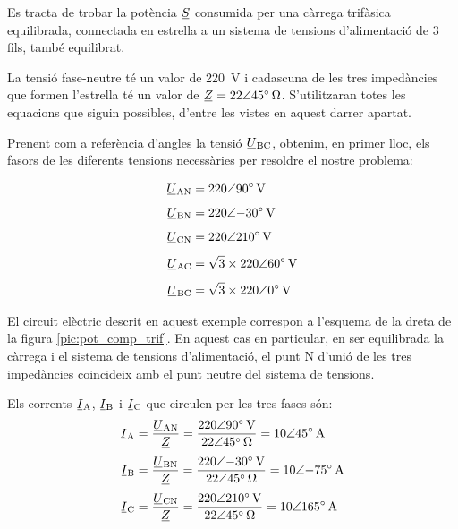 	
\begin{exemple}[\PotSistTresFils{}]
	\addcontentsxms{\PotSistTresFils}
    Es tracta de trobar la potència $\cmplx{S}$ consumida per una càrrega
    trifàsica equilibrada, connectada en estrella a un sistema de tensions
    d'alimentació  de 3 fils, també equilibrat.

    La tensió fase-neutre
    té un valor de \qty{220}{V} i cadascuna de les tres  impedàncies
    que formen l'estrella té un valor de $\cmplx{Z}=\complexqty{22:45}{\ohm}$.
     S'utilitzaran totes les equacions que
    siguin possibles, d'entre les vistes en aquest darrer apartat.

    Prenent com a referència d'angles la tensió
    $\cmplx{U}\ped{BC}$, obtenim, en primer lloc, els fasors de
    les diferents tensions necessàries per resoldre el nostre
    problema:

    \hfill
    \begin{minipage}[b]{7.5cm}
        
    \end{minipage}
    \hfill
    \begin{minipage}[b][5.7cm][t]{3.8cm}
    \begin{align*}
        \cmplx{U}\ped{AN} &= \complexqty{220:90}{V} \\[1ex]
        \cmplx{U}\ped{BN} &= \complexqty{220:-30}{V} \\[1ex]
        \cmplx{U}\ped{CN} &= \complexqty{220:210}{V} \\[1ex]
        \cmplx{U}\ped{AC} &= \sqrt{3}\times \complexqty{220:60}{V} \\[1ex]
        \cmplx{U}\ped{BC} &= \sqrt{3}\times \complexqty{220:0}{V}
    \end{align*}
    \end{minipage}
    \hfill{}
    
	El circuit elèctric descrit en aquest exemple  correspon a
	l'esquema de la dreta de la figura \vref{pic:pot_comp_trif}. En
	aquest cas en particular, en ser equilibrada la càrrega i el
	sistema de tensions d'alimentació, el punt N d'unió de  les tres impedàncies coincideix amb el punt neutre del sistema de tensions.

    Els corrents $\cmplx{I}\ped{A}$, $\cmplx{I}\ped{B}$ i $\cmplx{I}\ped{C}$ que
    circulen  per les tres fases són:
    \begin{align*}
        \cmplx{I}\ped{A} &=\frac{\cmplx{U}\ped{AN}}{\cmplx{Z}} =
        \frac{\complexqty{220:90}{V}}{\complexqty{22:45}{\ohm}} =
        \complexqty{10:45}{A}\\[1mm]
        \cmplx{I}\ped{B} &=\frac{\cmplx{U}\ped{BN}}{\cmplx{Z}} =
        \frac{\complexqty{220:-30}{V}}{\complexqty{22:45}{\ohm}} =
        \complexqty{10:-75}{A}\\[1mm]
        \cmplx{I}\ped{C} &=\frac{\cmplx{U}\ped{CN}}{\cmplx{Z}} =
        \frac{\complexqty{220:210}{V}}{\complexqty{22:45}{\ohm}} =
        \complexqty{10:165}{A}
    \end{align*}



\end{exemple}
